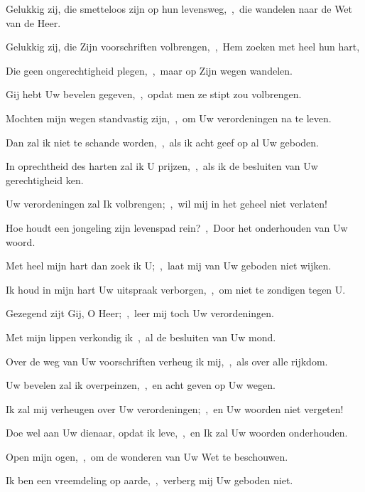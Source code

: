 \documentclass[12pt,twoside,a5paper]{article}
\begin{document}
\begin{halfparskip}


   Gelukkig zij, die smetteloos zijn op hun levensweg,~\sep\ die wandelen naar de Wet van de Heer.


  Gelukkig zij, die Zijn voorschriften volbrengen,~\sep\ Hem zoeken met heel hun hart,

  Die geen ongerechtigheid plegen,~\sep\ maar op Zijn wegen wandelen.

  Gij hebt Uw bevelen gegeven,~\sep\ opdat men ze stipt zou volbrengen.

  Mochten mijn wegen standvastig zijn,~\sep\ om Uw verordeningen na te leven.

  Dan zal ik niet te schande worden,~\sep\ als ik acht geef op al Uw geboden.

  In oprechtheid des harten zal ik U prijzen,~\sep\ als ik de besluiten van Uw gerechtigheid ken.

  Uw verordeningen zal Ik volbrengen;~\sep\ wil mij in het geheel niet verlaten!

   Hoe houdt een jongeling zijn levenspad rein?~\sep\ Door het onderhouden van Uw woord.

  Met heel mijn hart dan zoek ik U;~\sep\ laat mij van Uw geboden niet wijken.

  Ik houd in mijn hart Uw uitspraak verborgen,~\sep\ om niet te zondigen tegen U.

  Gezegend zijt Gij, O Heer;~\sep\ leer mij toch Uw verordeningen.

  Met mijn lippen verkondig ik~\sep\ al de besluiten van Uw mond.

  Over de weg van Uw voorschriften verheug ik mij,~\sep\ als over alle rijkdom.

  Uw bevelen zal ik overpeinzen,~\sep\ en acht geven op Uw wegen.

  Ik zal mij verheugen over Uw verordeningen;~\sep\ en Uw woorden niet vergeten!

   Doe wel aan Uw dienaar, opdat ik leve,~\sep\ en Ik zal Uw woorden onderhouden.

  Open mijn ogen,~\sep\ om de wonderen van Uw Wet te beschouwen.

  Ik ben een vreemdeling op aarde,~\sep\ verberg mij Uw geboden niet.


\end{halfparskip}
\end{document}
